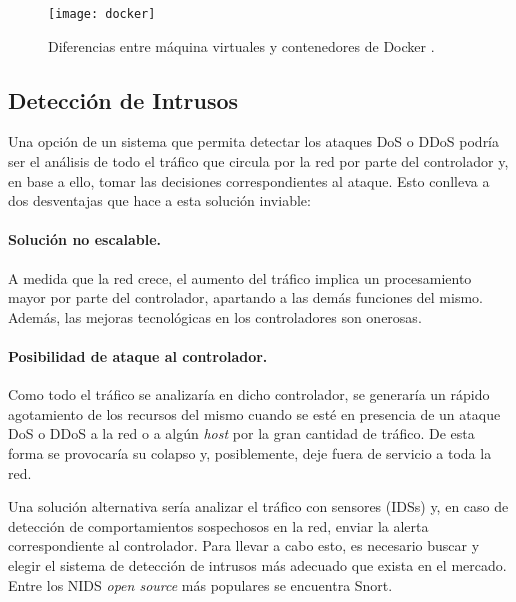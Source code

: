 \begin{figure}[!]
	\centering 
	\texttt{[image: docker]}
	\caption[Diferencias entre máquina virtuales y contenedores de Docker]{Diferencias entre máquina virtuales y contenedores de Docker
    \parencite{dif_docker_vm}.}
	\label{fig:docker}
\end{figure}


\subsection{Detección de Intrusos} \label{sec:herramienta_snort}

Una opción de un sistema que permita detectar los ataques DoS o DDoS podría ser
el análisis de todo el tráfico que circula por la red por parte del controlador
y, en base a ello, tomar las decisiones correspondientes al ataque.  Esto
conlleva a dos desventajas que hace a esta solución inviable:

\paragraph{Solución no escalable.} A medida que la red crece, el aumento del tráfico implica
un procesamiento mayor por parte del controlador, apartando a las demás
funciones del mismo. Además, las mejoras tecnológicas en los controladores son
onerosas. 
\paragraph{Posibilidad de ataque al controlador.} Como todo el tráfico se
analizaría en dicho controlador, se generaría un rápido agotamiento de los
recursos del mismo cuando se esté en presencia de un ataque DoS o DDoS a la red
o a algún \textit{host} por la gran cantidad de tráfico. De esta forma se
provocaría su colapso y, posiblemente, deje fuera de servicio a toda la red.

Una solución alternativa sería analizar el tráfico con sensores
(IDSs) y, en caso de detección de comportamientos sospechosos en la red, enviar
la alerta correspondiente al controlador. Para
llevar a cabo esto, es necesario buscar y elegir el sistema de detección de
intrusos más adecuado que exista en el mercado. Entre los NIDS \textit{open source} más
populares se encuentra Snort.

